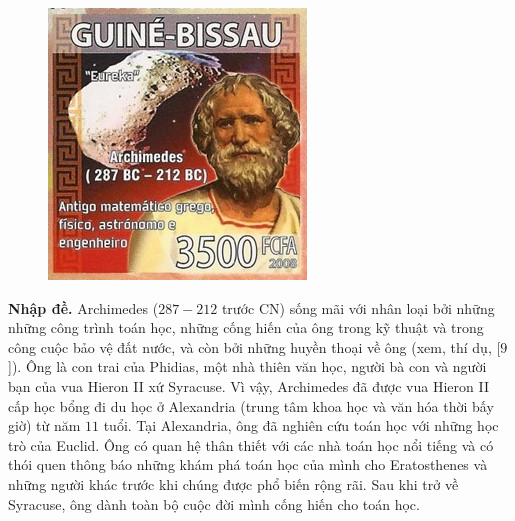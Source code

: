 \begin{multicols}{2}
	\begin{figure}[H]
		\vspace*{5pt}
		\centering
		\captionsetup{labelformat= empty, justification=centering}
		\includegraphics[width= 1\linewidth]{1}
		\vspace*{-20pt}
	\end{figure}
	\textbf{\color{lichsutoanhoc}Nhập đề.} Archimedes ($287-212$ trước CN) sống mãi với nhân loại bởi những những công trình toán học, những cống hiến của ông trong kỹ thuật và trong công cuộc bảo vệ đất nước, và còn bởi những huyền thoại về ông (xem, thí dụ, [$9$]).
	\vskip 0.1cm
	Ông là con trai của Phidias, một nhà thiên văn học, người bà con và người bạn của vua Hieron II xứ Syracuse. Vì vậy, Archimedes đã được vua Hieron II cấp học bổng đi du học ở Alexandria (trung tâm khoa học và văn hóa thời bấy giờ) từ năm $11$ tuổi. Tại Alexandria, ông đã nghiên cứu toán học với những học trò của Euclid. Ông có quan hệ thân thiết với các nhà toán học nổi tiếng và có thói quen thông báo những khám phá toán học của mình cho Eratosthenes và những người khác trước khi chúng được phổ biến rộng rãi.  
	\vskip 0.1cm
	Sau khi trở về Syracuse, ông dành toàn bộ cuộc đời mình cống hiến cho toán học. 

\end{multicols}
